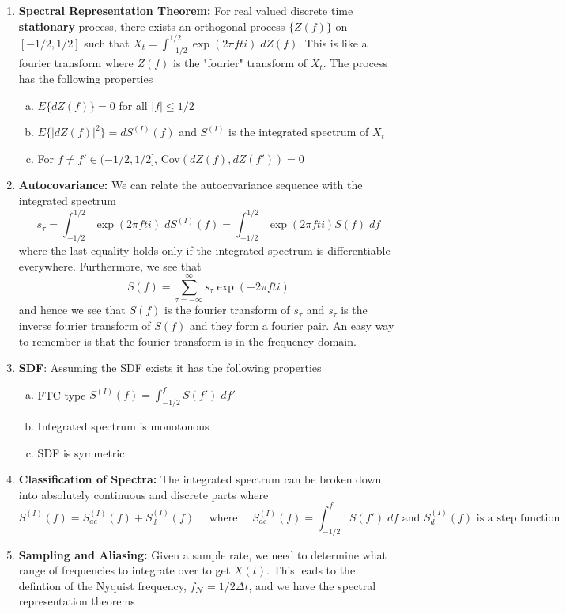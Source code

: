 \documentclass{article}
\begin{document}
\begin{enumerate}
    \item \textbf{Spectral Representation Theorem:} For real valued discrete time \textbf{stationary} process, there exists an orthogonal process \(\{Z(f)\}\) on \([-1/2, 1/2]\) such that \(X_t = \int_{-1/2}^{1/2} \exp( 2\pi fti)\;dZ(f)\). This is like a fourier transform where \(Z(f)\) is the "fourier" transform of \(X_t\). The process has the following properties
    \begin{enumerate} [a.]
        \item \(E\{dZ(f)\} = 0\) for all \(|f|\leq 1/2\)
        \item \(E\{|dZ(f)|^2\} = dS^{(I)}(f)\) and \(S^{(I)}\) is the integrated spectrum of \(X_t\)
        \item For \(f \neq f' \in (-1/2, 1/2]\), Cov\((dZ(f), dZ(f')) = 0\)
    \end{enumerate}
    \item \textbf{Autocovariance:} We can relate the autocovariance sequence with the integrated spectrum
    \[
    s_\tau = \int_{-1/2}^{1/2} \exp( 2\pi fti)\;dS^{(I)}(f) = \int_{-1/2}^{1/2} \exp( 2\pi fti)S(f)\;df
    \]
    where the last equality holds only if the integrated spectrum is differentiable everywhere. Furthermore, we see that
    \[
    S(f) = \sum_{\tau = -\infty}^{\infty} s_{\tau} \exp(- 2\pi fti)
    \]
    and hence we see that \(S(f)\) is the fourier transform of \(s_\tau\) and \(s_\tau\) is the inverse fourier transform of \(S(f)\) and they form a fourier pair. An easy way to remember is that the fourier transform is in the frequency domain.
    \item \textbf{SDF}: Assuming the SDF exists it has the following properties
    \begin{enumerate}[a.]
        \item FTC type \(S^{(I)}(f) = \int_{-1/2}^{f}S(f')\; df'\)
        \item Integrated spectrum is monotonous
        \item SDF is symmetric
    \end{enumerate}
    \item \textbf{Classification of Spectra:} The integrated spectrum can be broken down into absolutely continuous and discrete parts where
    \[
    S^{(I)}(f) = S_{ac}^{(I)}(f) + S_{d}^{(I)}(f) \quad \text{ where } \quad  S_{ac}^{(I)}(f) = \int_{-1/2}^f S(f') \; df \text{ and  } S_{d}^{(I)}(f) \text{ is a step function}
    \]
    \item \textbf{Sampling and Aliasing:} Given a sample rate, we need to determine what range of frequencies to integrate over to get \(X(t)\). This leads to the defintion of the Nyquist frequency, \(f_\mathcal{N} = 1/2\Delta t\),  and we have the spectral representation theorems

\end{enumerate}
\end{document}
